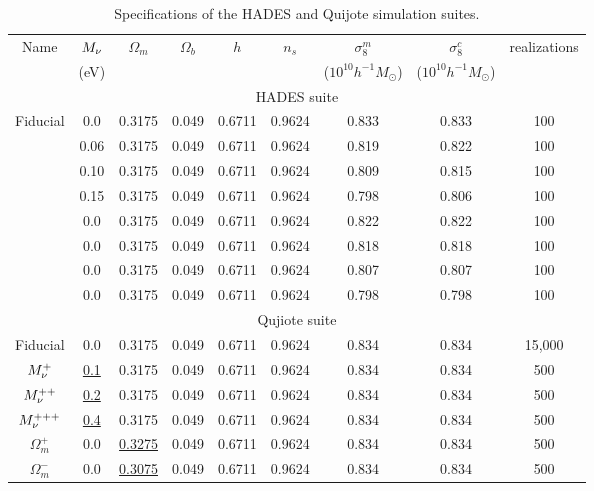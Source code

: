 \begin{table}
\caption{Specifications of the HADES and Quijote simulation suites.} 
\begin{center}
\begin{tabular}{ccccccccc} \toprule
    Name  &$M_\nu$ & $\Omega_m$ & $\Omega_b$ & $h$ & $n_s$ & $\sigma^m_8$ & $\sigma^c_8$ & realizations \\
      &({\footnotesize eV}) & & & & & ({\footnotesize $10^{10}h^{-1}M_\odot$}) & ({\footnotesize $10^{10}h^{-1}M_\odot$}) & \\[3pt] \hline\hline
    \multicolumn{9}{c}{HADES suite} \\ \hline
    Fiducial    & 0.0   & 0.3175 & 0.049 & 0.6711 & 0.9624 & 0.833 & 0.833 & 100 \\ 
                & 0.06  & 0.3175 & 0.049 & 0.6711 & 0.9624 & 0.819 & 0.822 & 100 \\ 
                & 0.10  & 0.3175 & 0.049 & 0.6711 & 0.9624 & 0.809 & 0.815 & 100 \\ 
                & 0.15  & 0.3175 & 0.049 & 0.6711 & 0.9624 & 0.798 & 0.806 & 100 \\ 
                & 0.0   & 0.3175 & 0.049 & 0.6711 & 0.9624 & 0.822 & 0.822 & 100 \\ 
                & 0.0   & 0.3175 & 0.049 & 0.6711 & 0.9624 & 0.818 & 0.818 & 100 \\ 
                & 0.0   & 0.3175 & 0.049 & 0.6711 & 0.9624 & 0.807 & 0.807 & 100 \\ 
                & 0.0   & 0.3175 & 0.049 & 0.6711 & 0.9624 & 0.798 & 0.798 & 100 \\[3pt]
    \hline \hline
    \multicolumn{9}{c}{Qujiote suite} \\ \hline
    Fiducial 	    & 0.0         & 0.3175 & 0.049 & 0.6711 & 0.9624 & 0.834 & 0.834 & 15,000 \\ 
    $M_\nu^+$       & \underline{0.1}   & 0.3175 & 0.049 & 0.6711 & 0.9624 & 0.834 & 0.834 & 500 \\ 
    $M_\nu^{++}$    & \underline{0.2}   & 0.3175 & 0.049 & 0.6711 & 0.9624 & 0.834 & 0.834 & 500 \\ 
    $M_\nu^{+++}$   & \underline{0.4}   & 0.3175 & 0.049 & 0.6711 & 0.9624 & 0.834 & 0.834 & 500 \\ 
    $\Omega_m^+$    & 0.0   & \underline{ 0.3275} & 0.049 & 0.6711 & 0.9624 & 0.834 & 0.834 & 500 \\ 
    $\Omega_m^-$    & 0.0   & \underline{ 0.3075} & 0.049 & 0.6711 & 0.9624 & 0.834 & 0.834 & 500 \\ 

\end{tabular}
\end{center}
\end{table}
